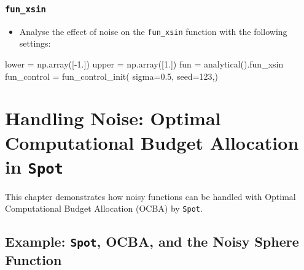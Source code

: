 \documentclass[
  letterpaper,
  DIV=11,
  numbers=noendperiod]{scrreprt}
\newenvironment{Shaded}{\begin{snugshade}}{\end{snugshade}}
\newcommand{\DecValTok}[1]{\textcolor[rgb]{0.68,0.00,0.00}{#1}}
\newcommand{\FloatTok}[1]{\textcolor[rgb]{0.68,0.00,0.00}{#1}}
\newcommand{\NormalTok}[1]{\textcolor[rgb]{0.00,0.23,0.31}{#1}}
\newcommand{\OperatorTok}[1]{\textcolor[rgb]{0.37,0.37,0.37}{#1}}
\providecommand{\tightlist}{%
  \setlength{\itemsep}{0pt}\setlength{\parskip}{0pt}}\usepackage{longtable,booktabs,array}
\begin{document}
\hypertarget{fun_xsin}{%
\subsection{\texorpdfstring{\texttt{fun\_xsin}}{fun\_xsin}}\label{fun_xsin}}

\begin{itemize}
\tightlist
\item
  Analyse the effect of noise on the \texttt{fun\_xsin} function with
  the following settings:
\end{itemize}

\begin{Shaded}
\begin{Highlighting}[]
\NormalTok{lower }\OperatorTok{=}\NormalTok{ np.array([}\OperatorTok{{-}}\FloatTok{1.}\NormalTok{])}
\NormalTok{upper }\OperatorTok{=}\NormalTok{ np.array([}\FloatTok{1.}\NormalTok{])}
\NormalTok{fun }\OperatorTok{=}\NormalTok{ analytical().fun\_xsin}
\NormalTok{fun\_control }\OperatorTok{=}\NormalTok{ fun\_control\_init(    }
\NormalTok{    sigma}\OperatorTok{=}\FloatTok{0.5}\NormalTok{,}
\NormalTok{    seed}\OperatorTok{=}\DecValTok{123}\NormalTok{,)}
\end{Highlighting}
\end{Shaded}

\hypertarget{sec-ocba}{%
\chapter{\texorpdfstring{Handling Noise: Optimal Computational Budget
Allocation in
\texttt{Spot}}{Handling Noise: Optimal Computational Budget Allocation in Spot}}\label{sec-ocba}}

This chapter demonstrates how noisy functions can be handled with
Optimal Computational Budget Allocation (OCBA) by \texttt{Spot}.

\hypertarget{example-spot-ocba-and-the-noisy-sphere-function}{%
\section{\texorpdfstring{Example: \texttt{Spot}, OCBA, and the Noisy
Sphere
Function}{Example: Spot, OCBA, and the Noisy Sphere Function}}\label{example-spot-ocba-and-the-noisy-sphere-function}}
\end{document}
